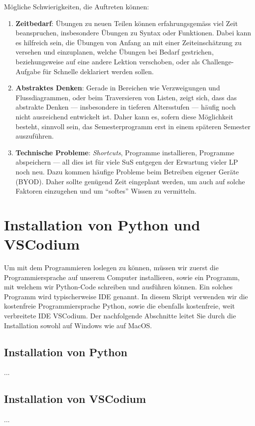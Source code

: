 Mögliche Schwierigkeiten, die Auftreten können:
\begin{enumerate}
\item \textbf{Zeitbedarf}: Übungen zu neuen Teilen können erfahrungsgemäss viel Zeit beanspruchen, insbesondere Übungen zu Syntax oder Funktionen. Dabei kann es hilfreich sein, die Übungen von Anfang an mit einer Zeiteinschätzung zu versehen und einzuplanen, welche Übungen bei Bedarf gestrichen, beziehungsweise auf eine andere Lektion verschoben, oder als Challenge-Aufgabe für Schnelle deklariert werden sollen.
\item \textbf{Abstraktes Denken}: Gerade in Bereichen wie Verzweigungen und Flussdiagrammen, oder beim Traversieren von Listen, zeigt sich, dass das abstrakte Denken --- insbesondere in tieferen Altersstufen --- häufig noch nicht ausreichend entwickelt ist. Daher kann es, sofern diese Möglichkeit besteht, sinnvoll sein, das Semesterprogramm erst in einem späteren Semester auszuführen.
\item \textbf{Technische Probleme}: \textit{Shortcuts}, Programme installieren, Programme abspeichern --- all dies ist für viele SuS entgegen der Erwartung vieler LP noch neu. Dazu kommen häufige Probleme beim Betreiben eigener Geräte (BYOD). Daher sollte genügend Zeit eingeplant werden, um auch auf solche Faktoren einzugehen und um ``softes'' Wissen zu vermitteln.
\end{enumerate}

\clearpage

\section*{Installation von Python und VSCodium}
Um mit dem Programmieren loslegen zu können, müssen wir zuerst die Programmiersprache auf unserem Computer installieren, sowie ein Programm, mit welchem wir Python-Code schreiben und ausführen können. Ein solches Programm wird typischerweise \gls{IDE} genannt. In diesem Skript verwenden wir die kostenfreie Programmiersprache Python, sowie die ebenfalls kostenfreie, weit verbreitete \gls{IDE} VSCodium. Der nachfolgende Abschnitte leitet Sie durch die Installation sowohl auf Windows wie auf MacOS.

\subsection*{Installation von Python}
...

\subsection*{Installation von VSCodium}
...